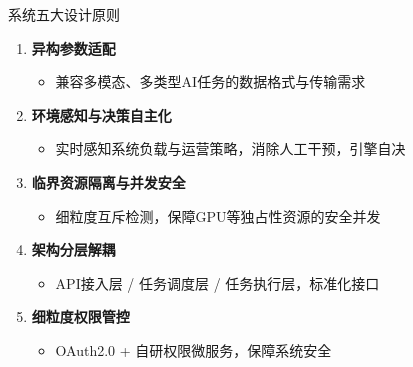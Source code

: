 \documentclass[aspectratio=169,UTF8,xcolor=table]{ctexbeamer}
\begin{document}
\begin{frame}{系统五大设计原则}
  \begin{enumerate}
    \item \textbf{异构参数适配}
    \begin{itemize}
      \item 兼容多模态、多类型AI任务的数据格式与传输需求
    \end{itemize}

    \item \textbf{环境感知与决策自主化}
    \begin{itemize}
      \item 实时感知系统负载与运营策略，消除人工干预，引擎自决
    \end{itemize}

    \item \textbf{临界资源隔离与并发安全}
    \begin{itemize}
      \item 细粒度互斥检测，保障GPU等独占性资源的安全并发
    \end{itemize}

    \item \textbf{架构分层解耦}
    \begin{itemize}
      \item API接入层 / 任务调度层 / 任务执行层，标准化接口
    \end{itemize}

    \item \textbf{细粒度权限管控}
    \begin{itemize}
      \item OAuth2.0 + 自研权限微服务，保障系统安全
    \end{itemize}
  \end{enumerate}
\end{frame}
\end{document}
